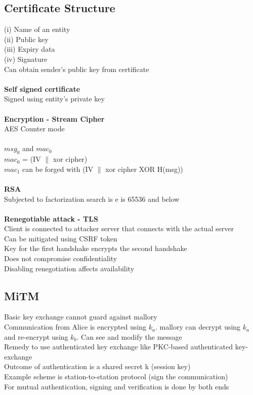 \documentclass[11pt]{article}
\begin{document}
\begin{multicols*}{3}
\subsection*{Certificate Structure}
(i) Name of an entity \\
(ii) Public key \\
(iii) Expiry data \\
(iv) Signature\\
Can obtain sender's public key from certificate\\
\\
\textbf{Self signed certificate}\\
Signed using entity's private key\\\\
\textbf{Encryption - Stream Cipher}\\
AES Counter mode\\\\
$msg_{0}$ and $mac_{0}$ \\
$ mac_{0}$ = (IV $\|$ xor cipher)\\
$mac_{1}$ can be forged with (IV $\|$ xor cipher XOR H(msg))\\\\
\textbf{RSA}\\
Subjected to factorization search is e is  65536 and below\\\\
\textbf{Renegotiable attack - TLS}\\
Client is connected to attacker server that connects with the actual server\\
Can be mitigated using CSRF token\\
Key for the first handshake encrypts the second handshake\\
Does not compromise confidentiality\\
Disabling renegotiation affects availability
\subsection*{MiTM}
Basic key exchange cannot guard against mallory\\
Communication from Alice is encrypted using $k_{a}$. mallory can decrypt using $k_{a}$ and re-encrypt using $k_{b}$.
Can see and modify the message\\
Remedy to use authenticated key exchange like PKC-based authenticated key-exchange\\
Outcome of authentication is a shared secret k (session key)\\
Example scheme is station-to-station protocol (sign the communication)\\
For mutual authentication, signing and verification is done by both ends

\end{multicols*}
\end{document}
